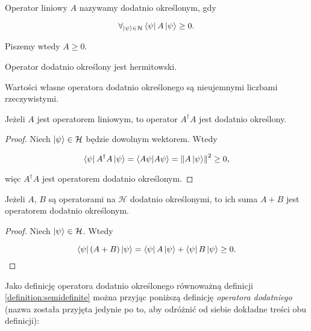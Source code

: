 \begin{definition}
    \label{definition:semidefinite}
    Operator liniowy $A$ nazywamy dodatnio określonym, gdy

    $$
        \forall_{\ket{\psi} \in \mathcal{H}} \bra{\psi} A \ket{\psi} \geq 0.
    $$

    Piszemy wtedy $A \geq 0$.
\end{definition}

\begin{theorem}
    \label{theorem:positive}
    Operator dodatnio określony jest hermitowski.
\end{theorem}

\begin{theorem}
    \label{theorem:positivevalues}
    Wartości własne operatora dodatnio określonego są nieujemnymi liczbami rzeczywistymi.
\end{theorem}

\begin{theorem}
    \label{theorem:adaga}
    Jeżeli $A$ jest operatorem liniowym, to operator $A ^ {\dag} A$ jest dodatnio określony.
\end{theorem}

\begin{proof}
    Niech $\ket{\psi} \in \mathcal{H}$ będzie dowolnym wektorem. Wtedy

    $$
        \bra{\psi} A ^ {\dag} A \ket{\psi} = \bra{A \psi}\ket{A \psi}=\left\|A \ket{\psi}\right\|^2 \geq 0,
    $$

    więc $A ^ {\dag} A$ jest operatorem dodatnio określonym.
\end{proof}

\begin{theorem}
    Jeżeli $A$, $B$ są operatorami na $\mathcal{H}$ dodatnio określonymi, to ich suma $A + B$ jest operatorem dodatnio określonym.
\end{theorem}

\begin{proof}
    Niech $\ket{\psi} \in \mathcal{H}$. Wtedy

    $$
        \bra{\psi} (A + B) \ket{\psi}=\bra{\psi} A \ket{\psi} + \bra{\psi} B \ket{\psi} \geq 0.
    $$
\end{proof}

Jako definicję operatora dodatnio określonego równoważną definicji \ref{definition:semidefinite} można przyjąc poniższą definicję \textit{operatora dodatniego} (nazwa została przyjęta jedynie po to, aby odróżnić od siebie dokładne treści obu definicji):

